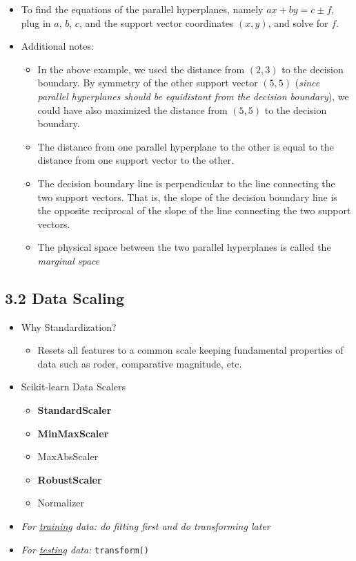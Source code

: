 \documentclass{article}
\begin{document}
\begin{itemize}
    \item To find the equations of the parallel hyperplanes, namely $ax + by = c \pm f$, plug in $a$, $b$, $c$, and the support vector coordinates $(x, y)$, and solve for $f$.
    \item Additional notes:
    \begin{itemize}
        \item In the above example, we used the distance from $(2, 3)$ to the decision boundary. By symmetry of the other support vector $(5, 5)$ (\emph{since parallel hyperplanes should be equidistant from the decision boundary}), we could have also maximized the distance from $(5, 5)$ to the decision boundary.
        \item The distance from one parallel hyperplane to the other is equal to the distance from one support vector to the other.
        \item The decision boundary line is perpendicular to the line connecting the two support vectors. That is, the slope of the decision boundary line is the opposite reciprocal of the slope of the line connecting the two support vectors.
        \item The physical space between the two parallel hyperplanes is called the \emph{marginal space}
    \end{itemize}
\end{itemize}

\subsection*{3.2 Data Scaling}
\begin{itemize}
    \item Why Standardization?
    \begin{itemize}
        \item Resets all features to a common scale keeping fundamental properties of data such as roder, comparative magnitude, etc.
    \end{itemize}
    \item Scikit-learn Data Scalers
    \begin{itemize}
        \item \textbf{StandardScaler}
        \item \textbf{MinMaxScaler}
        \item MaxAbsScaler
        \item \textbf{RobustScaler}
        \item Normalizer
    \end{itemize}
    \item \emph{For \underline{training} data: do fitting first and do transforming later}
    \item \emph{For \underline{testing} data:} \texttt{transform()}
\end{itemize}
\end{document}
